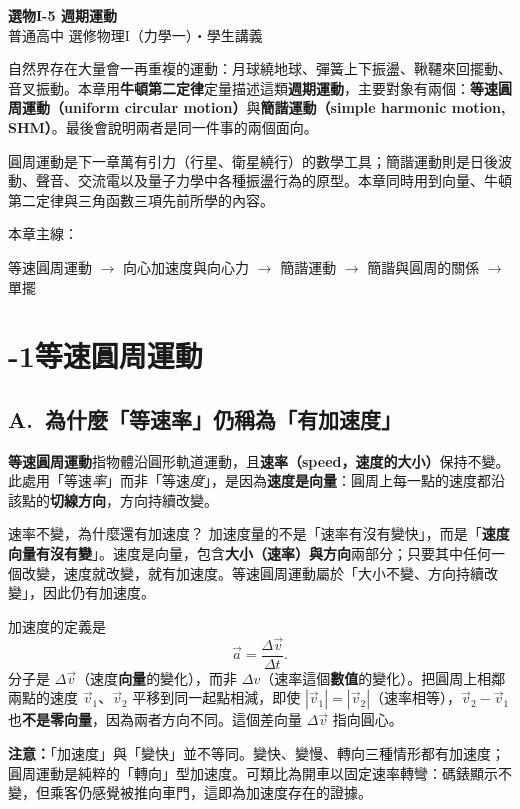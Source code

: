 \documentclass[11pt]{article}
\begin{document}
\begin{center}
{\sffamily\Huge\bfseries 選物I-5 週期運動}\\[3pt]
{\sffamily\large 普通高中 選修物理I（力學一）・學生講義}
\end{center}
\vspace{0.6em}

自然界存在大量會一再重複的運動：月球繞地球、彈簧上下振盪、鞦韆來回擺動、音叉振動。本章用\textbf{牛頓第二定律}定量描述這類\textbf{週期運動}，主要對象有兩個：\textbf{等速圓周運動（uniform circular motion）}與\textbf{簡諧運動（simple harmonic motion, SHM）}。最後會說明兩者是同一件事的兩個面向。

圓周運動是下一章萬有引力（行星、衛星繞行）的數學工具；簡諧運動則是日後波動、聲音、交流電以及量子力學中各種振盪行為的原型。本章同時用到向量、牛頓第二定律與三角函數三項先前所學的內容。

\medskip
本章主線：

\begin{center}
等速圓周運動 $\rightarrow$ 向心加速度與向心力 $\rightarrow$ 簡諧運動 $\rightarrow$ 簡諧與圓周的關係 $\rightarrow$ 單擺
\end{center}

\section*{-1\quad 等速圓周運動}

\subsection*{\sffamily A.\ 為什麼「等速率」仍稱為「有加速度」}

\textbf{等速圓周運動}指物體沿圓形軌道運動，且\textbf{速率（speed，速度的大小）}保持不變。此處用「等速\textit{率}」而非「等速\textit{度}」，是因為\textbf{速度是向量}：圓周上每一點的速度都沿該點的\textbf{切線方向}，方向持續改變。

\begin{補充框}{速率不變，為什麼還有加速度？}
加速度量的不是「速率有沒有變快」，而是「\textbf{速度向量有沒有變}」。速度是向量，包含\textbf{大小（速率）與方向}兩部分；只要其中任何一個改變，速度就改變，就有加速度。等速圓周運動屬於「大小不變、方向持續改變」，因此仍有加速度。

加速度的定義是
$$\vec a=\frac{\Delta\vec v}{\Delta t}.$$
分子是 $\Delta\vec v$（速度\textbf{向量}的變化），而非 $\Delta v$（速率這個\textbf{數值}的變化）。把圓周上相鄰兩點的速度 $\vec v_1$、$\vec v_2$ 平移到同一起點相減，即使 $|\vec v_1|=|\vec v_2|$（速率相等），$\vec v_2-\vec v_1$ 也\textbf{不是零向量}，因為兩者方向不同。這個差向量 $\Delta\vec v$ 指向圓心。

\textbf{注意：}「加速度」與「變快」並不等同。變快、變慢、轉向三種情形都有加速度；圓周運動是純粹的「轉向」型加速度。可類比為開車以固定速率轉彎：碼錶顯示不變，但乘客仍感覺被推向車門，這即為加速度存在的證據。
\end{補充框}
\end{document}
